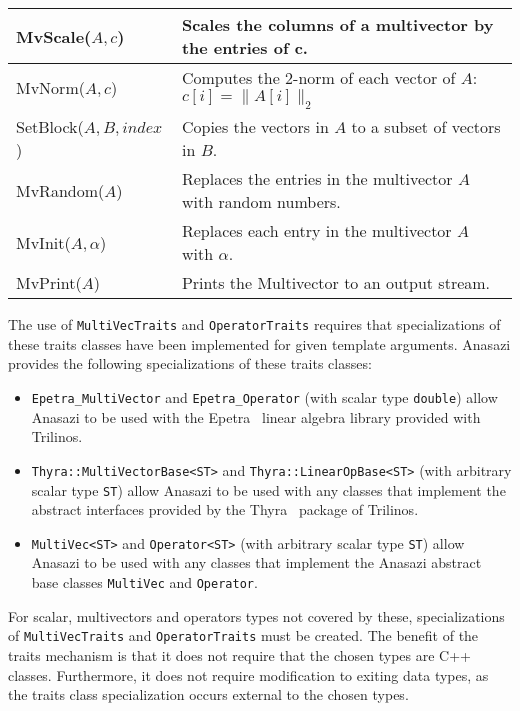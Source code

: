 \documentclass[acmtoms]{acmtrans2m}
\newcommand{\aspace}[1]{\texttt{#1}}
\begin{document}
\begin{table}
\begin{center}
\begin{tabular}{| p{4cm} | p{8cm} |}
MvScale($A,c$)    & Scales the columns of a multivector by the entries
of c. \\\hline

MvNorm($A,c$)     & Computes the 2-norm of each vector of
$A$: $c[i] = \|A[i]\|_2$  \\\hline

SetBlock($A,B,index$) & Copies the vectors in $A$ to a subset of vectors in
$B$. \\\hline

MvRandom($A$) & Replaces the entries in the multivector $A$ with random
numbers.  \\\hline

MvInit($A,\alpha$) & Replaces each entry in the multivector $A$ with $\alpha$.
\\\hline

MvPrint($A$)    & Prints the Multivector to an output stream.
\\\hline \hline
\end{tabular}
\end{center}
\end{table}

The use of \aspace{MultiVecTraits} and \aspace{OperatorTraits} requires that
specializations of these traits classes have been implemented for
given template arguments. Anasazi provides the following
specializations of these traits classes:
\begin{itemize}
  \item \aspace{Epetra\_MultiVector} and \aspace{Epetra\_Operator} (with scalar type
    \aspace{double}) allow Anasazi to be used with the Epetra~\cite{Trilinos:Epetra} linear
    algebra library provided with Trilinos.
  \item \aspace{Thyra::MultiVectorBase<ST>} and
    \aspace{Thyra::LinearOpBase<ST>} (with arbitrary scalar type
    \aspace{ST}) allow Anasazi to be used with any classes that implement the abstract interfaces
    provided by the Thyra~\cite{Trilinos:Thyra} package of Trilinos.
  \item \aspace{MultiVec<ST>} and \aspace{Operator<ST>} (with
    arbitrary scalar type \aspace{ST}) allow Anasazi to be used with any classes that implement
    the Anasazi abstract base classes \aspace{MultiVec} and \aspace{Operator}.
\end{itemize}

For scalar, multivectors and operators types not covered by these,
specializations of \aspace{MultiVecTraits} and \aspace{OperatorTraits}
must be created. The benefit of the traits mechanism is that it does
not require that the chosen types are C++ classes.  Furthermore, it
does not require modification to exiting data types, as the traits
class specialization occurs external to the chosen types.
\end{document}
